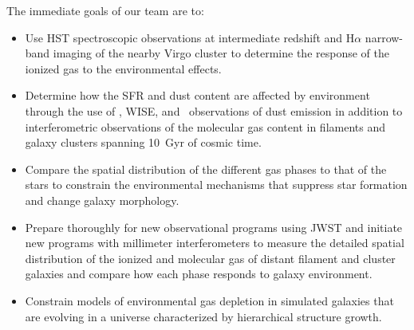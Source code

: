 \documentclass[11pt]{article}
\begin{document}
The immediate goals of our team are to:
\vspace{-0.1in}
\begin{itemize}
\item Use HST  spectroscopic  observations at  intermediate redshift and H$\alpha$ narrow-band imaging of the nearby Virgo cluster to determine the response of the ionized gas to the environmental effects.
\vspace{-0.1in}
\item Determine how the SFR and dust content are
  affected by environment through the use of \spitzer, WISE, and \herschel\ observations of
  dust emission in addition to interferometric observations of
  the molecular gas content in filaments and galaxy clusters spanning 10~Gyr of
  cosmic time.
\vspace{-0.1in}
\item Compare the spatial distribution of the different gas phases to that of the stars to constrain the environmental mechanisms that suppress star formation and change galaxy morphology.
\vspace{-0.1in}
\item Prepare thoroughly for new observational programs using JWST and initiate new programs with millimeter interferometers to measure the detailed spatial distribution of the ionized and molecular gas of distant filament and cluster galaxies and compare how each phase responds to galaxy environment.
\vspace{-0.1in}
\item Constrain models of environmental gas depletion in simulated galaxies that are evolving in a universe characterized by hierarchical structure growth.
\end{itemize}
\vspace{-0.1in}

\end{document}
